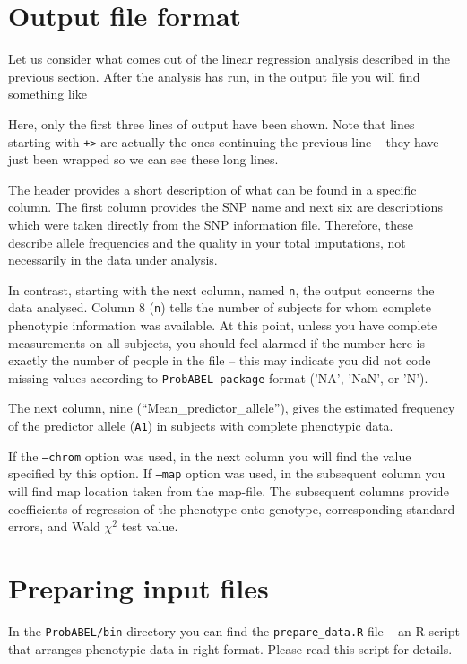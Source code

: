\documentclass[12pt,a4paper]{article}
\newcommand{\PA}{\texttt{ProbABEL-package}}
\begin{document}
\section{Output file format}
Let us consider what comes out of the linear regression analysis
described in the previous section. After the analysis has run, in
the output file you will find something like
\begin{small}

\end{small}

Here, only the first three lines of output have been shown. Note that lines
starting with \texttt{+>} are actually the ones continuing the
previous line -- they have just been wrapped so we can see
these long lines.

The header provides a short description of what can be found in a
specific column. The first column provides the SNP name and
next six are descriptions which were taken directly from the
SNP information file. Therefore, these describe allele frequencies and
the quality in your total imputations, not necessarily in the data under
analysis.

In contrast, starting with the next column, named \texttt{n},
the output concerns the data analysed. Column 8 (\texttt{n}) tells the
number of subjects for whom complete phenotypic information was
available. At this point, unless you have complete measurements on all
subjects, you should feel alarmed if the number here is exactly the
number of people in the file -- this may indicate you did not code
missing values according to \PA{} format ('NA', 'NaN', or 'N').

The next column, nine (``Mean\_predictor\_allele''), gives the estimated
frequency of the predictor allele (\texttt{A1}) in subjects with complete
phenotypic data.

If the \texttt{--chrom} option was used, in the next column you will
find the value specified by this option. If \texttt{--map} option was
used, in the subsequent column you will find map location taken from
the map-file. The subsequent columns provide coefficients of
regression of the phenotype onto genotype, corresponding standard
errors, and Wald $\chi^2$ test value.


\section{Preparing input files}
In the \texttt{ProbABEL/bin} directory you can find the
\texttt{prepare\_data.R} file -- an R script that arranges phenotypic
data in right format. Please read this script for details.
\end{document}

